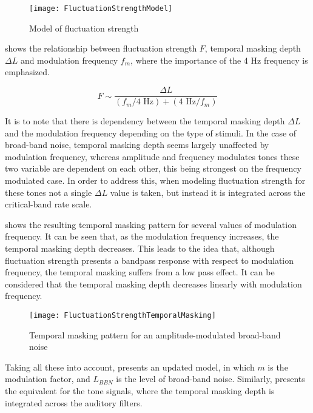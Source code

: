 \documentclass[../main.tex]{subfiles}
\begin{document}
\begin{theoreticalbackground}
\begin{figure}[!ht]
    \centering
    \texttt{[image: FluctuationStrengthModel]}
    \caption{Model of fluctuation strength
        \cite[pp. 254]{Fastl2007Psychoacoustics}}
    \label{fig:flucstrenmodel}
\end{figure}

 shows the relationship between fluctuation
strength $F$, temporal masking depth $\Delta L$ and modulation frequency
$f_{m}$, where the importance of the 4 Hz frequency is emphasized.

\begin{equation}
    F \sim \frac{\Delta L}{(f_{m}/4\text{ Hz}) + (4\text{ Hz}/f_{m})}
    \label{eq:flucstrentempmaskmodfreq}
\end{equation}

It is to note that there is dependency between the temporal masking depth
$\Delta L$ and the modulation frequency depending on the type of stimuli. In the
case of broad-band noise, temporal masking depth seems largely unaffected by
modulation frequency, whereas amplitude and frequency modulates tones these two
variable are dependent on each other, this being strongest on the frequency
modulated case. In order to address this, when modeling fluctuation strength
for these tones not a single $\Delta L$ value is taken, but instead it is
integrated across the critical-band rate scale.

 shows the resulting temporal masking pattern for
several values of modulation frequency. It can be seen that, as the modulation
frequency increases, the temporal masking depth decreases. This leads to the
idea that, although fluctuation strength presents a bandpass response with
respect to modulation frequency, the temporal masking suffers from a low pass
effect. It can be considered that the temporal masking depth decreases linearly
with modulation frequency.

\begin{figure}[!ht]
    \centering
    \texttt{[image: FluctuationStrengthTemporalMasking]}
    \caption{Temporal masking pattern for an amplitude-modulated broad-band
        noise \cite[pp. 255]{Fastl2007Psychoacoustics}}
    \label{fig:flucstrenmasking}
\end{figure}

Taking all these into account,  presents an
updated model, in which $m$ is the modulation factor, and $L_{BBN}$ is the level
of broad-band noise. Similarly,  presents the
equivalent for the tone signals, where the temporal masking depth is integrated
across the auditory filters.


\end{theoreticalbackground}
\end{document}
